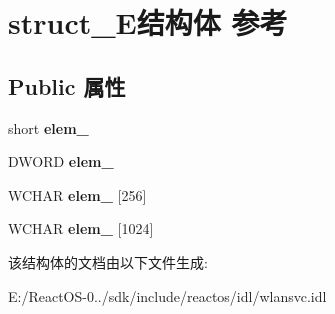 \hypertarget{structstruct___e}{}\section{struct\+\_\+\+E结构体 参考}
\label{structstruct___e}
\subsection*{Public 属性}
\begin{DoxyCompactItemize}
\item 
\mbox{\label{structstruct___e_a5262868271332f5d424abdf5d38e8bba}} 
short {\bfseries elem\+\_}
\item 
\mbox{\label{structstruct___e_a876468fa27106d3bdf9137eb3378a36c}} 
D\+W\+O\+RD {\bfseries elem\+\_}
\item 
\mbox{\label{structstruct___e_a38a3a320c5c7f83cda0bf1507e0989f2}} 
W\+C\+H\+AR {\bfseries elem\+\_} \mbox{[}256\mbox{]}
\item 
\mbox{\label{structstruct___e_a9d20e964f621a7c678b26eea868c64db}} 
W\+C\+H\+AR {\bfseries elem\+\_} \mbox{[}1024\mbox{]}
\end{DoxyCompactItemize}


该结构体的文档由以下文件生成\+:\begin{DoxyCompactItemize}
\item 
E\+:/\+React\+O\+S-\/0../sdk/include/reactos/idl/wlansvc.\+idl\end{DoxyCompactItemize}
